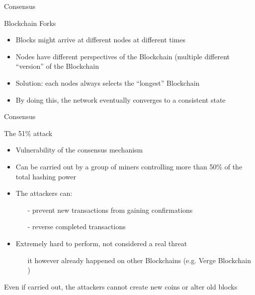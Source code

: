 \documentclass{beamer}
\begin{document}
  
  
  \begin{frame}{Consensus}
      \begin{block}{Blockchain Forks}
        \begin{itemize}
            \item Blocks might arrive at different nodes at different times
            \item Nodes have different perspectives of the Blockchain (multiple different ``version'' of the Blockchain
            \item Solution: each nodes always selects the ``longest'' Blockchain %
            \item By doing this, the network eventually converges to a consistent state
        \end{itemize}
      \end{block}
  \end{frame}
  
  
  
  
  \begin{frame}{Consensus}
      \begin{block}{The 51\% attack}
        \begin{itemize}
            \item Vulnerability of the consensus mechanism
            \item Can be carried out by a group of miners controlling more than 50\% of the total hashing power
            \item The attackers can: 
            \begin{itemize}
                \item[-] prevent new transactions from gaining confirmations
                \item[-] reverse completed transactions
            \end{itemize}
            \item Extremely hard to perform, not considered a real threat 
            \begin{itemize}
                \item[\MVRightarrow] it however already happened on other Blockchains (e.g. Verge Blockchain \cite{bitcoinnews2018})
            \end{itemize}
        \end{itemize}
      \end{block}
      Even if carried out, the attackers cannot create new coins or alter old blocks
  \end{frame}
  
\end{document}
